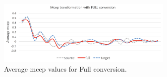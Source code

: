 \begin{figure}[htb]
\begin{minipage}[b]{1\linewidth}
  \centering
  \centerline{\includegraphics[width=8.5cm]{image5}}
\end{minipage}

\caption{Average mcep values for Full conversion.}
\label{fig:fullresult}
%
\end{figure}